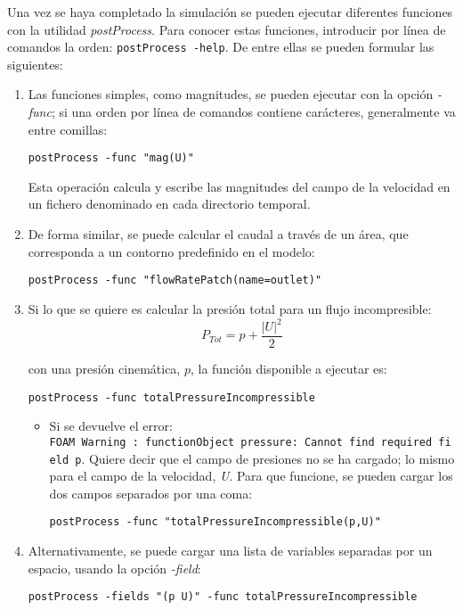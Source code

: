 Una vez se haya completado la simulación se pueden ejecutar diferentes
funciones con la utilidad \emph{postProcess}. Para conocer estas
funciones, introducir por línea de comandos la orden:
\texttt{postProcess\ -help}. De entre ellas se pueden formular las
siguientes:

\begin{enumerate}
\def\labelenumi{\arabic{enumi}.}
\item
  Las funciones simples, como magnitudes, se pueden ejecutar con la
  opción \emph{-func}; si una orden por línea de comandos contiene
  carácteres, generalmente va entre comillas:

  \texttt{postProcess\ -func\ "mag(U)"}

  Esta operación calcula y escribe las magnitudes del campo de la
  velocidad en un fichero denominado en cada directorio temporal.
\item
  De forma similar, se puede calcular el caudal a través de un área, que
  corresponda a un contorno predefinido en el modelo:

  \texttt{postProcess\ -func\ "flowRatePatch(name=outlet)"}
\item
  Si lo que se quiere es calcular la presión total para un flujo
  incompresible:\\

  \[P_{Tot}= p + \frac{|U|^2}{2}\]

  con una presión cinemática, \(p\), la función disponible a ejecutar
  es:

  \texttt{postProcess\ -func\ totalPressureIncompressible}

  \begin{itemize}
  \item
    Si se devuelve el error:
    \texttt{FOAM\ Warning\ :\ functionObject\ pressure:\ Cannot\ find\ required\ field\ p}.
    Quiere decir que el campo de presiones no se ha cargado; lo mismo
    para el campo de la velocidad, \emph{U}. Para que funcione, se
    pueden cargar los dos campos separados por una coma:

    \texttt{postProcess\ -func\ "totalPressureIncompressible(p,U)"}
  \end{itemize}
\item
  Alternativamente, se puede cargar una lista de variables separadas por
  un espacio, usando la opción \emph{-field}:

  \texttt{postProcess\ -fields\ "(p\ U)"\ -func\ totalPressureIncompressible}
\end{enumerate}

